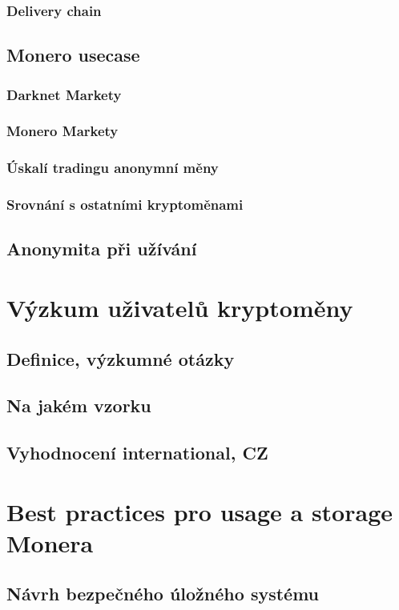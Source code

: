 \documentclass[
  printed, %
  table,   %
  nolof,     %
  nolot,     %
           oneside, color
]{fithesis3}
\begin{document}
\subsection{Delivery chain}

\section{Monero usecase}
\subsection{Darknet Markety}
\subsection{Monero Markety}
\subsection{Úskalí tradingu anonymní měny}
\subsection{Srovnání s ostatními kryptoměnami}

\section{Anonymita při užívání}

\chapter{Výzkum uživatelů kryptoměny}
\section{Definice, výzkumné otázky}
\section{Na jakém vzorku}
\section{Vyhodnocení international, CZ}

\chapter{Best practices pro usage a storage Monera}
\section{Návrh bezpečného úložného systému}
\end{document}
